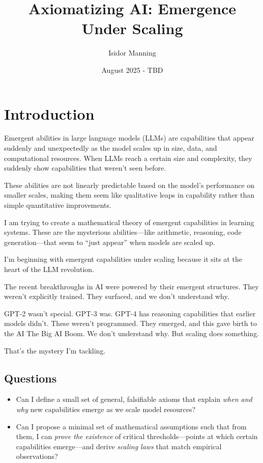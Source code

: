 \documentclass[12pt]{article}
\title{Axiomatizing AI: Emergence Under Scaling}
\author{Isidor Manning}
\date{August 2025 - TBD}
\begin{document}
\maketitle
\tableofcontents
\newpage

\section{Introduction}
Emergent abilities in large language models (LLMs) are capabilities that appear suddenly and unexpectedly as the model scales up in size, data, and computational resources. When LLMs reach a certain size and complexity, they suddenly show capabilities that weren't seen before.

These abilities are not linearly predictable based on the model's performance on smaller scales, making them seem like qualitative leaps in capability rather than simple quantitative improvements. 

I am trying to create a mathematical theory of emergent capabilities in learning systems. These are the mysterious abilities—like arithmetic, reasoning, code generation—that seem to “just appear” when models are scaled up.

I’m beginning with emergent capabilities under scaling because it sits at the heart of the LLM revolution.

The recent breakthroughs in AI were powered by their emergent structures. They weren’t explicitly trained. They surfaced, and we don’t understand why.

GPT-2 wasn’t special. GPT-3 was. GPT-4 has reasoning capabilities that earlier models didn’t. These weren’t programmed. They emerged, and this gave birth to the AI The Big AI Boom. We don’t understand why. But scaling does something.

That’s the mystery I’m tackling.

\subsection{Questions}

\begin{itemize}
    \item Can I define a small set of general, falsifiable axioms that explain \textit{when and why} new capabilities emerge as we scale model resources?

    \item Can I propose a minimal set of mathematical assumptions such that from them, I can \textit{prove the existence} of critical thresholds—points at which certain capabilities emerge—and derive \textit{scaling laws} that match empirical observations?
\end{itemize}
\end{document}
